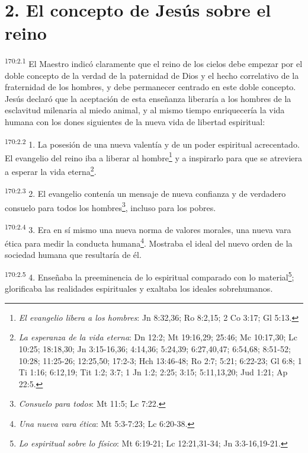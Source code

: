 \section*{2. El concepto de Jesús sobre el reino}
\par 
\textsuperscript{170:2.1} El Maestro indicó claramente que el reino de los cielos debe empezar por el doble concepto de la verdad de la paternidad de Dios y el hecho correlativo de la fraternidad de los hombres, y debe permanecer centrado en este doble concepto. Jesús declaró que la aceptación de esta enseñanza liberaría a los hombres de la esclavitud milenaria al miedo animal, y al mismo tiempo enriquecería la vida humana con los dones siguientes de la nueva vida de libertad espiritual:

\par 
\textsuperscript{170:2.2} 1. La posesión de una nueva valentía y de un poder espiritual acrecentado. El evangelio del reino iba a liberar al hombre\footnote{\textit{El evangelio libera a los hombres}: Jn 8:32,36; Ro 8:2,15; 2 Co 3:17; Gl 5:13.} y a inspirarlo para que se atreviera a esperar la vida eterna\footnote{\textit{La esperanza de la vida eterna}: Dn 12:2; Mt 19:16,29; 25:46; Mc 10:17,30; Lc 10:25; 18:18,30; Jn 3:15-16,36; 4:14,36; 5:24,39; 6:27,40,47; 6:54,68; 8:51-52; 10:28; 11:25-26; 12:25,50; 17:2-3; Hch 13:46-48; Ro 2:7; 5:21; 6:22-23; Gl 6:8; 1 Ti 1:16; 6:12,19; Tit 1:2; 3:7; 1 Jn 1:2; 2:25; 3:15; 5:11,13,20; Jud 1:21; Ap 22:5.}.

\par 
\textsuperscript{170:2.3} 2. El evangelio contenía un mensaje de nueva confianza y de verdadero consuelo para todos los hombres\footnote{\textit{Consuelo para todos}: Mt 11:5; Lc 7:22.}, incluso para los pobres.

\par 
\textsuperscript{170:2.4} 3. Era en sí mismo una nueva norma de valores morales, una nueva vara ética para medir la conducta humana\footnote{\textit{Una nueva vara ética}: Mt 5:3-7:23; Lc 6:20-38.}. Mostraba el ideal del nuevo orden de la sociedad humana que resultaría de él.

\par 
\textsuperscript{170:2.5} 4. Enseñaba la preeminencia de lo espiritual comparado con lo material\footnote{\textit{Lo espiritual sobre lo físico}: Mt 6:19-21; Lc 12:21,31-34; Jn 3:3-16,19-21.}; glorificaba las realidades espirituales y exaltaba los ideales sobrehumanos.

